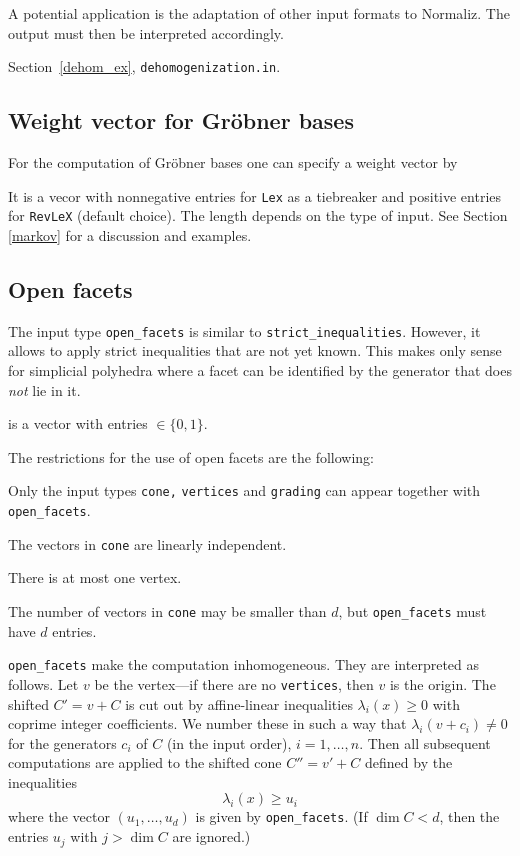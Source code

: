 A potential application is the adaptation of other input formats to Normaliz. The output must then be interpreted accordingly.

Section~\ref{dehom_ex}, \verb|dehomogenization.in|.

\subsection{Weight vector for Gröbner bases}

For the computation of Gröbner bases one can specify a weight vector by
\begin{itemize}
	\itemtt[gb\_weight]
\end{itemize}
It is a vecor with nonnegative entries for \verb|Lex| as a tiebreaker and positive entries for \verb|RevLeX| (default choice). The length depends on the type of input. See Section \ref{markov} for a discussion and examples.

\subsection{Open facets}\label{open_facets}

The input type \verb|open_facets| is similar to \verb|strict_inequalities|. However, it allows to apply strict inequalities that are not yet known. This makes only sense for simplicial polyhedra where a facet can be identified by the generator that does \emph{not} lie in it.

\begin{itemize}
	 is a vector with entries $\in \{0,1\}$.
\end{itemize}

The restrictions for the use of open facets are the following:
\begin{arab}
	\item Only the input types \verb|cone,| \verb|vertices| and \verb|grading| can appear together with \verb|open_facets|.
	\item The vectors in \verb|cone| are linearly independent.
	\item There is at most one vertex.
\end{arab}
The number of vectors in \verb|cone| may be smaller than $d$, but \verb|open_facets| must have $d$ entries.


\verb|open_facets| make the computation inhomogeneous. They are interpreted as follows. Let $v$ be the vertex---if there are no \verb|vertices|, then $v$ is the origin. The shifted $C'=v+C$ is cut out by affine-linear inequalities $\lambda_i(x)\ge 0$ with coprime integer coefficients. We number these in such a way that $\lambda_i(v+c_i)\neq 0$ for the generators $c_i$ of $C$ (in the input order), $i=1,\dots,n$. Then all subsequent computations are applied to the shifted cone $C''=v'+C$ defined by the inequalities
$$
\lambda_i(x)\ge u_i
$$
where the vector $(u_1,\dots,u_d)$ is given by \verb|open_facets|. (If $\dim C<d$, then the entries $u_j$ with $j> \dim C$ are ignored.)

